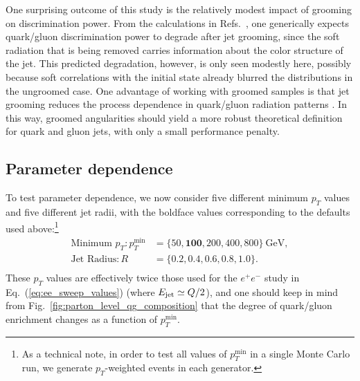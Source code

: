 \documentclass[11pt,letterpaper]{article}
\newcommand{\GeV}{\text{GeV}}
\DeclareRobustCommand{\Fig}[1]{Fig.~\ref{#1}}
\DeclareRobustCommand{\Eq}[1]{Eq.~(\ref{#1})}
\DeclareRobustCommand{\Refs}[1]{Refs.~\cite{#1}}
\newcommand{\be}{\begin{equation}}
\newcommand{\ee}{\end{equation}}
\begin{document}
One surprising outcome of this study is the relatively modest impact of grooming on discrimination power.  From the calculations in \Refs{Dasgupta:2013ihk,Larkoski:2014wba}, one generically expects quark/gluon discrimination power to degrade after jet grooming, since the soft radiation that is being removed carries information about the color structure of the jet.  This predicted degradation, however, is only seen modestly here, possibly because soft correlations with the initial state already blurred the distributions in the ungroomed case.   One advantage of working with groomed samples is that jet grooming reduces the process dependence in quark/gluon radiation patterns \cite{Frye:2016okc,Frye:2016aiz}.   In this way, groomed angularities should yield a more robust theoretical definition for quark and gluon jets, with only a small performance penalty.


\subsection{Parameter dependence}
\label{subsec:pp_para}

To test parameter dependence, we now consider five different minimum $p_T$ values and five different jet radii, with the boldface values corresponding to the defaults used above:\footnote{As a technical note, in order to test all values of $p^\text{min}_T$ in a single Monte Carlo run, we generate $p_T$-weighted events in each generator.}
\be
\label{eq:pp_pTRsweep}
\begin{aligned}
\text{Minimum $p_T$}: p^\text{min}_T &= \{ 50, \mathbf{100}, 200, 400, 800\}~\GeV, \\
\text{Jet Radius}: R &= \{ 0.2, \mathbf{0.4}, 0.6, 0.8, 1.0\}. \\
\end{aligned}
\ee
These $p_T$ values are effectively twice those used for the $e^+ e^-$ study in \Eq{eq:ee_sweep_values} (where $E_{\rm jet} \simeq Q/2$), and one should keep in mind from \Fig{fig:parton_level_qg_composition} that the degree of quark/gluon enrichment changes as a function of $p^\text{min}_T$.
\end{document}
